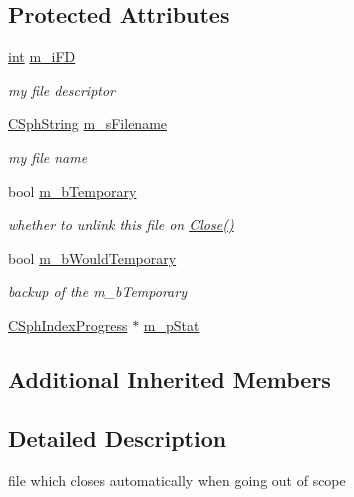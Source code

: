 \subsection*{Protected Attributes}
\begin{DoxyCompactItemize}
\item 
\hyperlink{sphinxexpr_8cpp_a4a26e8f9cb8b736e0c4cbf4d16de985e}{int} \hyperlink{classCSphAutofile_aca862db8620b51f8c5a83517080c2436}{m\-\_\-i\-F\-D}
\begin{DoxyCompactList}\small\item\em my file descriptor \end{DoxyCompactList}\item 
\hyperlink{structCSphString}{C\-Sph\-String} \hyperlink{classCSphAutofile_ace9555717055d742239289a0eef5feb8}{m\-\_\-s\-Filename}
\begin{DoxyCompactList}\small\item\em my file name \end{DoxyCompactList}\item 
bool \hyperlink{classCSphAutofile_a4d22136d629374124bf4e6e136f4130f}{m\-\_\-b\-Temporary}
\begin{DoxyCompactList}\small\item\em whether to unlink this file on \hyperlink{classCSphAutofile_af010e09fa8ddae598af8a9b09d104365}{Close()} \end{DoxyCompactList}\item 
bool \hyperlink{classCSphAutofile_a037aa32a2262c8dea1f1c9fbf05a36f5}{m\-\_\-b\-Would\-Temporary}
\begin{DoxyCompactList}\small\item\em backup of the m\-\_\-b\-Temporary \end{DoxyCompactList}\item 
\hyperlink{structCSphIndexProgress}{C\-Sph\-Index\-Progress} $\ast$ \hyperlink{classCSphAutofile_a8f4a21d9d657efd75b15263eaae873fe}{m\-\_\-p\-Stat}
\end{DoxyCompactItemize}
\subsection*{Additional Inherited Members}


\subsection{Detailed Description}
file which closes automatically when going out of scope 

